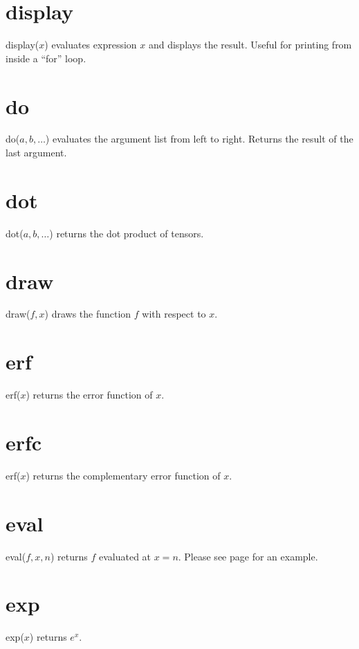 \documentclass[12pt,openany]{report}
\begin{document}
\section*{display}
display($x$) evaluates expression $x$ and displays the result.
Useful for printing from inside a ``for'' loop.

\section*{do}
do($a,b,\ldots$) evaluates the argument list from left to right.
Returns the result of the last argument.

\section*{dot}
dot($a,b,\ldots$) returns the dot product of tensors.

\section*{draw}
draw($f,x$) draws the function $f$ with respect to $x$.

\section*{erf}
erf($x$) returns the error function of $x$.

\section*{erfc}
erf($x$) returns the complementary error function of $x$.

\section*{eval}
eval($f,x,n$) returns $f$ evaluated at $x=n$.
Please see page \pageref{integral} for an example.

\section*{exp}
exp($x$) returns $e^x$.
\end{document}

